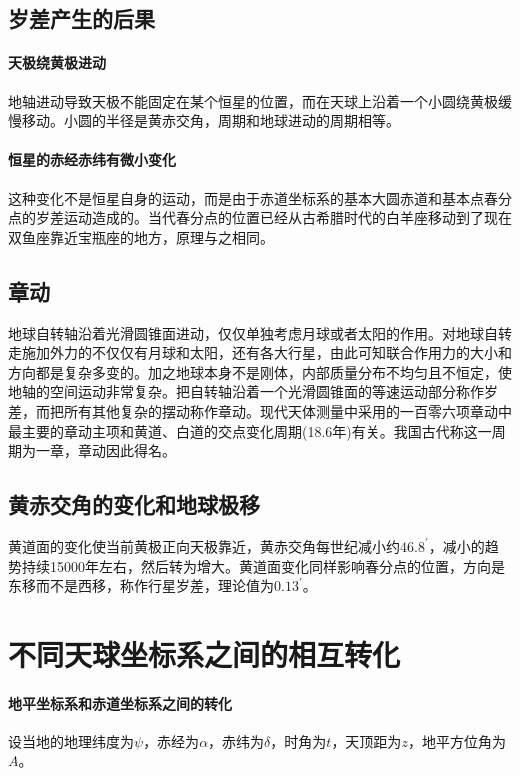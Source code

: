 \subsection{岁差产生的后果}
\paragraph{天极绕黄极进动}地轴进动导致天极不能固定在某个恒星的位置，而在天球上沿着一个小圆绕黄极缓慢移动。小圆的半径是黄赤交角，周期和地球进动的周期相等。
\paragraph{恒星的赤经赤纬有微小变化}这种变化不是恒星自身的运动，而是由于赤道坐标系的基本大圆赤道和基本点春分点的岁差运动造成的。当代春分点的位置已经从古希腊时代的白羊座移动到了现在双鱼座靠近宝瓶座的地方，原理与之相同。
\subsection{章动}地球自转轴沿着光滑圆锥面进动，仅仅单独考虑月球或者太阳的作用。对地球自转走施加外力的不仅仅有月球和太阳，还有各大行星，由此可知联合作用力的大小和方向都是复杂多变的。加之地球本身不是刚体，内部质量分布不均匀且不恒定，使地轴的空间运动非常复杂。把自转轴沿着一个光滑圆锥面的等速运动部分称作岁差，而把所有其他复杂的摆动称作章动。现代天体测量中采用的一百零六项章动中最主要的章动主项和黄道、白道的交点变化周期(18.6年)有关。我国古代称这一周期为一章，章动因此得名。
\subsection{黄赤交角的变化和地球极移}黄道面的变化使当前黄极正向天极靠近，黄赤交角每世纪减小约$46.8^\prime$，减小的趋势持续15000年左右，然后转为增大。黄道面变化同样影响春分点的位置，方向是东移而不是西移，称作行星岁差，理论值为$0.13^\prime$。

\section{不同天球坐标系之间的相互转化}
\paragraph{地平坐标系和赤道坐标系之间的转化}
设当地的地理纬度为$\psi$，赤经为$\alpha$，赤纬为$\delta$，时角为$t$，天顶距为$z$，地平方位角为$A$。


